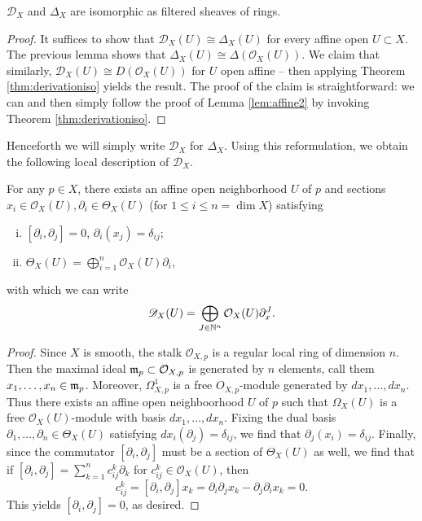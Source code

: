 \begin{theorem}
    $\mathscr{D}_X$ and $\Delta_X$ are isomorphic as filtered sheaves of rings.
    \label{thm:Dequiv}
\end{theorem}
\begin{proof}
    It suffices to show that $\mathscr{D}_X(U)\cong\Delta_X(U)$ for every affine open $U\subset X$.
    The previous lemma shows that $\Delta_X(U)\cong\Delta(\mathcal{O}_X(U))$. We claim that similarly,
    $\mathscr{D}_X(U)\cong D(\mathcal{O}_X(U))$ for $U$ open affine -- then applying Theorem \ref{thm:derivationiso} yields
    the result. The proof of the claim is straightforward: we can and then simply follow the proof of Lemma
    \ref{lem:affine2} by invoking Theorem \ref{thm:derivationiso}.
\end{proof}

Henceforth we will simply write $\mathscr{D}_X$ for $\Delta_X$. Using this reformulation,
we obtain the following local description of $\mathscr{D}_X$.

\begin{lemma}
    For any $p\in X$, there exists an affine open neighborhood $U$ of $p$ and sections
    $x_i\in\mathcal{O}_X(U),\partial_i\in\Theta_X(U)$ (for $1\leq i\leq n=\dim X$) satisfying
    \begin{enumerate}[(i)]
        \item $[\partial_i,\partial_j]=0$, $\partial_i(x_j)=\delta_{ij}$;
        \item $\Theta_X(U)=\bigoplus_{i=1}^n\mathcal{O}_X(U)\partial_i$,
    \end{enumerate}
    with which we can write
    \[\mathscr{D}_X(U)=\bigoplus_{J\in\mathbb{N}^n}\mathcal{O}_X(U)\partial_x^J.\]
\end{lemma}
\begin{proof}
    Since $X$ is smooth, the stalk $\mathcal{O}_{X,p}$ is a regular local ring of dimension $n$.
    Then the maximal ideal $\mathfrak m_p\subset \mathcal{O}_{X,p}$ is generated by $n$ elements, call them
    $x_1,\ldots,x_n\in\mathfrak m_p$. Moreover, $\Omega^1_{X,p}$ is a free $O_{X,p}$-module generated
    by $dx_1,\ldots, dx_n$. Thus there exists an affine open neighboorhood
    $U$ of $p$ such that $\Omega_X(U)$ is a free $\mathcal{O}_X(U)$-module with basis
    $dx_1,\ldots,dx_n$. Fixing the dual basis $\partial_1,\ldots,\partial_n\in\Theta_X(U)$
    satisfying $dx_i(\partial_j)=\delta_{ij}$, we find that $\partial_j(x_i)=\delta_{ij}$.
    Finally, since the commutator $[\partial_i,\partial_j]$ must be a section of $\Theta_X(U)$
    as well, we find that if $[\partial_i,\partial_j] = \sum_{k=1}^n c_{ij}^k\partial_k$
    for $c_{ij}^k\in\mathcal{O}_X(U)$, then
    \[c_{ij}^k=[\partial_i,\partial_j]x_k=\partial_i\partial_jx_k - \partial_j\partial_ix_k=0.\]
    This yields $[\partial_i,\partial_j]=0$, as desired.
\end{proof}


